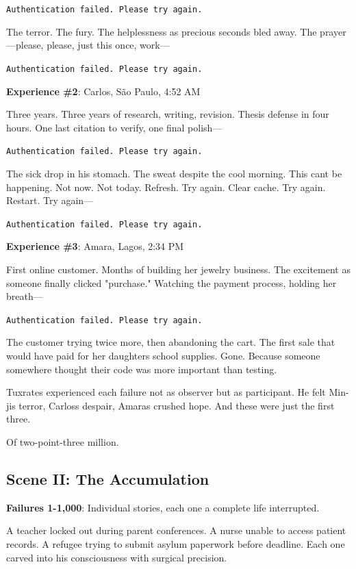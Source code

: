 \texttt{Authentication\ failed.\ Please\ try\ again.}

The terror. The fury. The helplessness as precious seconds bled away. The prayer---please, please, just this once, work---

\texttt{Authentication\ failed.\ Please\ try\ again.}

\textbf{Experience \#2}: Carlos, São Paulo, 4:52 AM

Three years. Three years of research, writing, revision. Thesis defense in four hours. One last citation to verify, one final polish---

\texttt{Authentication\ failed.\ Please\ try\ again.}

The sick drop in his stomach. The sweat despite the cool morning. This can\textquotesingle t be happening. Not now. Not today. Refresh. Try again. Clear cache. Try again. Restart. Try again---

\texttt{Authentication\ failed.\ Please\ try\ again.}

\textbf{Experience \#3}: Amara, Lagos, 2:34 PM

First online customer. Months of building her jewelry business. The excitement as someone finally clicked "purchase." Watching the payment process, holding her breath---

\texttt{Authentication\ failed.\ Please\ try\ again.}

The customer trying twice more, then abandoning the cart. The first sale that would have paid for her daughter\textquotesingle s school supplies. Gone. Because someone somewhere thought their code was more important than testing.

Tuxrates experienced each failure not as observer but as participant. He felt Min-ji\textquotesingle s terror, Carlos\textquotesingle s despair, Amara\textquotesingle s crushed hope. And these were just the first three.

Of two-point-three million.

\bookdivider

\subsection{Scene II: The Accumulation}\label{scene-ii-the-accumulation}

\textbf{Failures 1-1,000}: Individual stories, each one a complete life interrupted.

A teacher locked out during parent conferences. A nurse unable to access patient records. A refugee trying to submit asylum paperwork before deadline. Each one carved into his consciousness with surgical precision.

